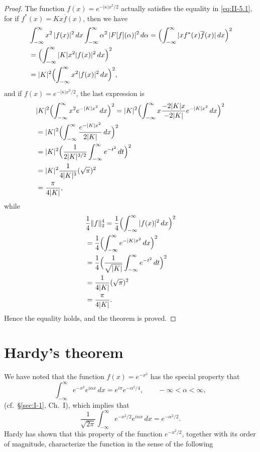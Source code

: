 \begin{proof}
The function $f(x)=e^{-|\kappa|x^{2}/2}$ actually satisfies the equality in \eqref{eq:II-5.1}, for if $f^{*}(x)=K x\overline{f}(x)$, then we have
\[
\begin{aligned}
&\int_{-\infty}^{\infty}x^{2}\,|f(x)|^{2}\,dx
\int_{-\infty}^{\infty}\alpha^{2}\,|F[f](\alpha)|^{2}\,d\alpha = \Bigl(\int_{-\infty}^{\infty}|x f^{*}(x)\overline{f}(x)|\,dx\Bigr)^{2}\\
&= \Bigl(\int_{-\infty}^{\infty}|K|x^{2}|f(x)|^{2}\,dx\Bigr)^{2}\\
&= |K|^{2}\Bigl(\int_{-\infty}^{\infty}x^{2}|f(x)|^{2}\,dx\Bigr)^{2},
\end{aligned}
\]
and if $f(x)=e^{-|\kappa|x^{2}/2}$, the last expression is
\[
\begin{aligned}
&|K|^{2}\Bigl(\int_{-\infty}^{\infty}x^{2}e^{-|K|x^{2}}\,dx\Bigr)^{2} = |K|^{2}\Bigl(\int_{-\infty}^{\infty}x\frac{-2|K|x}{-2|K|}e^{-|K|x^{2}}\,dx\Bigr)^{2}\\
&= |K|^{2}\Bigl(\int_{-\infty}^{\infty}\frac{e^{-|K|x^{2}}}{2|K|}\,dx\Bigr)^{2}\\
&= |K|^{2}\Bigl(\frac{1}{2|K|^{3/2}}\int_{-\infty}^{\infty}e^{-t^{2}}\,dt\Bigr)^{2}\\
&= |K|^{2}\frac{1}{4|K|^{3}}(\sqrt{\pi})^{2}\\
&= \frac{\pi}{4|K|},
\end{aligned}
\]
while
\[
\begin{aligned}
&\frac{1}{4}\|f\|_{2}^{4} = \frac{1}{4}\Bigl(\int_{-\infty}^{\infty}|f(x)|^{2}\,dx\Bigr)^{2}\\
&= \frac{1}{4}\Bigl(\int_{-\infty}^{\infty}e^{-|K|x^{2}}\,dx\Bigr)^{2}\\
&= \frac{1}{4}\Bigl(\frac{1}{\sqrt{|K|}}\int_{-\infty}^{\infty}e^{-t^{2}}\,dt\Bigr)^{2}\\
&= \frac{1}{4|K|}(\sqrt{\pi})^{2}\\
&= \frac{\pi}{4|K|}.
\end{aligned}
\]
Hence the equality holds, and the theorem is proved.
\end{proof}

\setcounter{section}{5}
\section{Hardy's theorem}
\label{sec:II-6}

We have noted that the function $f(x)=e^{-x^{2}}$ has the special property that
\[
\int_{-\infty}^{\infty}e^{-x^{2}}e^{i\alpha x}\,dx=e^{i\pi}e^{-\alpha^{2}/4},\qquad-\infty<\alpha<\infty,
\]
(cf.\ \S\ref{sec:I-1}, Ch.~I), which implies that
\[
\frac{1}{\sqrt{2\pi}}\int_{-\infty}^{\infty}e^{-x^{2}/2}e^{i\alpha x}\,dx=e^{-\alpha^{2}/2}.
\]
Hardy has shown that this property of the function $e^{-x^{2}/2}$, together with its order of magnitude, characterize the function in the sense of the following

